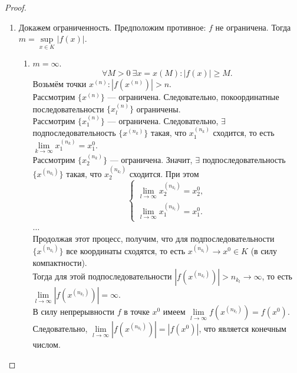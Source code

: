 \documentclass[12pt,a4paper]{report}
\begin{document}
\begin{proof}
    \begin{enumerate}
        \item Докажем ограниченность. Предположим противное: $f$ не ограничена. Тогда $m=\sup\limits_{x\in K}|f(x)|$.

        \begin{enumerate}
            \item $m = \infty$.
            \[
            \forall M>0\ \exists x=x(M)\colon |f(x)|\geq M.
            \]
            Возьмём точки $x^{(n)}\colon |f(x^{(n)})|>n$. \\
            Рассмотрим $\{x^{(n)}\}$ --- ограничена. Следовательно, покоординатные последовательности $\{x_l^{(n)}\}$ ограничены. \\
            Рассмотрим $\{x_1^{(n)}\}$ --- ограничена. Следовательно, $\exists$ подпоследовательность $\{x^{(n_k)}\}$ такая, что $x_1^{(n_k)}$ сходится, то есть $\lim\limits_{k\to\infty} x_1^{(n_k)}=x_1^0$. \\
            Рассмотрим $\{x_2^{(n_k)}\}$ --- ограничена. Значит, $\exists$ подпоследовательность $\{x^{(n_{k_l})}\}$ такая, что $x_2^{(n_{k_l})}$ сходится. При этом
            \[
            \begin{cases}
               \lim\limits_{l\to\infty} x_2^{(n_{k_l})}=x_2^0,\\
               \lim\limits_{l\to\infty} x_1^{(n_{k_l})}=x_1^0.
            \end{cases}
            \]
            $\dots$ \\
            Продолжая этот процесс, получим, что для подпоследовательности $\{x^{(n_{k_l})}\}$ все координаты сходятся, то есть $x^{(n_{k_l})}\to x^0\in K$ (в силу компактности). \\
            
            Тогда для этой подпоследовательности $|f(x^{(n_{k_l})})|>n_{k_l}\to\infty$, то есть $\lim\limits_{l\to\infty} |f(x^{(n_{k_l})})| = \infty$. \\
            В силу непрерывности $f$ в точке $x^0$ имеем $\lim\limits_{l\to\infty} f(x^{(n_{k_l})}) = f(x^0)$. \\
            
            Следовательно, $\lim\limits_{l\to\infty} |f(x^{(n_{k_l})})| = |f(x^0)|$,
            что является конечным числом.
        \end{enumerate}


\end{enumerate}
\end{proof}
\end{document}

